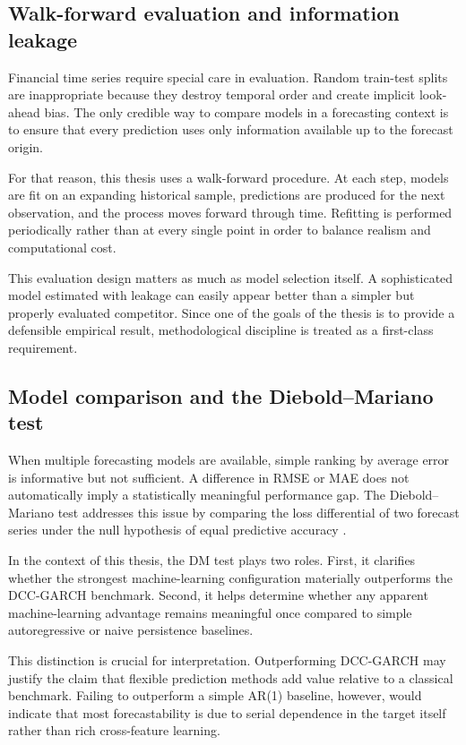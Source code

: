 \subsection{Walk-forward evaluation and information leakage}

Financial time series require special care in evaluation. Random train-test splits are inappropriate because they destroy temporal order and create implicit look-ahead bias. The only credible way to compare models in a forecasting context is to ensure that every prediction uses only information available up to the forecast origin.

For that reason, this thesis uses a walk-forward procedure. At each step, models are fit on an expanding historical sample, predictions are produced for the next observation, and the process moves forward through time. Refitting is performed periodically rather than at every single point in order to balance realism and computational cost.

This evaluation design matters as much as model selection itself. A sophisticated model estimated with leakage can easily appear better than a simpler but properly evaluated competitor. Since one of the goals of the thesis is to provide a defensible empirical result, methodological discipline is treated as a first-class requirement.

\subsection{Model comparison and the Diebold--Mariano test}

When multiple forecasting models are available, simple ranking by average error is informative but not sufficient. A difference in RMSE or MAE does not automatically imply a statistically meaningful performance gap. The Diebold--Mariano test addresses this issue by comparing the loss differential of two forecast series under the null hypothesis of equal predictive accuracy \cite{diebold1995}.

In the context of this thesis, the DM test plays two roles. First, it clarifies whether the strongest machine-learning configuration materially outperforms the DCC-GARCH benchmark. Second, it helps determine whether any apparent machine-learning advantage remains meaningful once compared to simple autoregressive or naive persistence baselines.

This distinction is crucial for interpretation. Outperforming DCC-GARCH may justify the claim that flexible prediction methods add value relative to a classical benchmark. Failing to outperform a simple AR(1) baseline, however, would indicate that most forecastability is due to serial dependence in the target itself rather than rich cross-feature learning.

